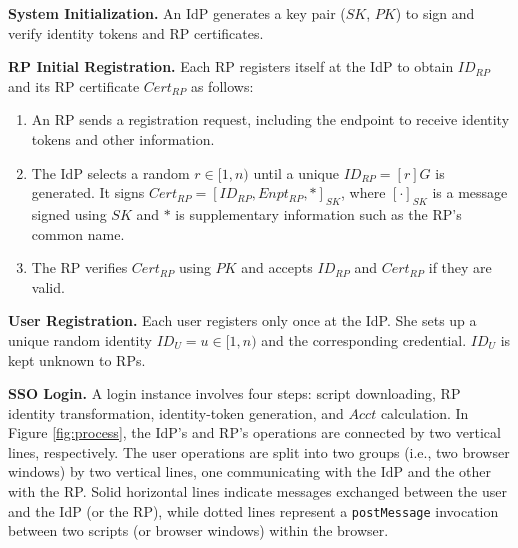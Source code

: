 \noindent \textbf{System Initialization.}
An IdP generates a key pair ($SK$, $PK$) to sign and verify identity tokens and RP certificates.

\vspace{1mm}
\noindent\textbf{RP Initial Registration.}
Each RP registers itself at the IdP to obtain $ID_{RP}$ and its RP certificate $Cert_{RP}$ as follows:
\vspace{-\topsep}\begin{enumerate}
\setlength{\topsep}{0pt}
\setlength{\partopsep}{0pt}
\setlength{\itemsep}{0pt}
\setlength{\parsep}{0pt}
\setlength{\parskip}{0pt}
\item
An RP sends a registration request, including the endpoint to receive identity tokens and other information.
\item
The IdP selects a random $r \in [1,n)$ until a unique $ID_{RP} = [r]G$ is generated.
It signs $Cert_{RP} = [ID_{RP}, Enpt_{RP}, *]_{SK}$,
     where $[\cdot]_{SK}$ is a message signed using $SK$ and $*$ is supplementary information such as the RP's common name.
\item
The RP verifies $Cert_{RP}$ using $PK$ and accepts $ID_{RP}$ and $Cert_{RP}$ if they are valid.
\end{enumerate}


\noindent\textbf{User Registration.}
Each user registers only once at the IdP. She sets up a unique random identity $ID_U = u \in [1, n)$ and the corresponding credential. $ID_U$ is kept unknown to RPs.


\vspace{1mm}
\noindent\textbf{SSO Login.} A login instance %
involves four steps: script downloading, RP identity transformation, identity-token generation, and $Acct$ calculation. In Figure \ref{fig:process}, the IdP's and RP's operations are connected by two vertical lines, respectively. The user operations are split into two groups (i.e., two browser windows) by two vertical lines, one communicating with the IdP and the other with the RP. Solid horizontal lines indicate messages exchanged between the user and the IdP (or the RP), while dotted lines represent a \verb+postMessage+ invocation between two scripts (or browser windows) within the browser.


